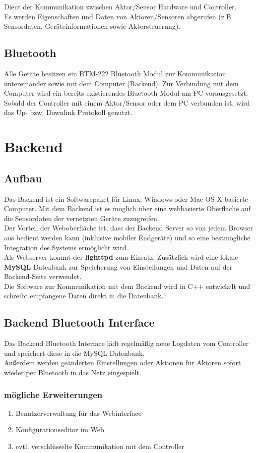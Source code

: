 \documentclass[12pt,a4paper]{article}
\begin{document}
Dient der Kommunikation zwischen Aktor/Sensor Hardware und Controller.\\
Es werden Eigenschaften und Daten von Aktoren/Sensoren abgerufen (z.B. Sensordaten, Geräteinformationen sowie Aktorsteuerung). 

\subsection{Bluetooth}
Alle Geräte besitzen ein BTM-222 Bluetooth Modul zur Kommunikation untereinander sowie mit dem Computer (Backend). Zur Verbindung mit dem Computer wird ein bereits existierendes Bluetooth Modul am PC vorausgesetzt. \\
Sobald der Controller mit einem Aktor/Sensor oder dem PC verbunden ist, wird das Up- bzw. Downlink Protokoll genutzt.

\section{Backend}

\subsection{Aufbau}

Das Backend ist ein Softwarepaket für Linux, Windows oder Mac OS X basierte Computer. Mit dem Backend ist es möglich über eine webbasierte Oberfläche auf die Sensordaten der vernetzten Geräte zuzugreifen. \\
Der Vorteil der Weboberfläche ist, dass der Backend Server so von jedem Browser aus bedient werden kann (inklusive mobiler Endgeräte) und so eine bestmögliche Integration des Systems ermöglicht wird. \\
Als Webserver kommt der {\bf lighttpd} zum Einsatz. Zusätzlich wird eine lokale {\bf MySQL} Datenbank zur Speicherung von Einstellungen und Daten auf der Backend-Seite verwendet.\\
Die Software zur Kommunikation mit dem Backend wird in C++ entwickelt und schreibt empfangene Daten direkt in die Datenbank.

\subsection{Backend Bluetooth Interface}
\label{subsec:BTBackend}

Das Backend Bluetooth Interface lädt regelmäßig neue Logdaten vom Controller und speichert diese in die MySQL Datenbank.\\
Außerdem werden geänderten Einstellungen oder Aktionen für Aktoren sofort wieder per Bluetooth in das Netz eingespielt.

\subsubsection{mögliche Erweiterungen}

\begin{enumerate}
	\item Benutzerverwaltung für das Webinterface
	\item Konfigurationseditor im Web
	\item evtl. verschlüsselte Kommunikation mit dem Controller
\end{enumerate}
\end{document}
